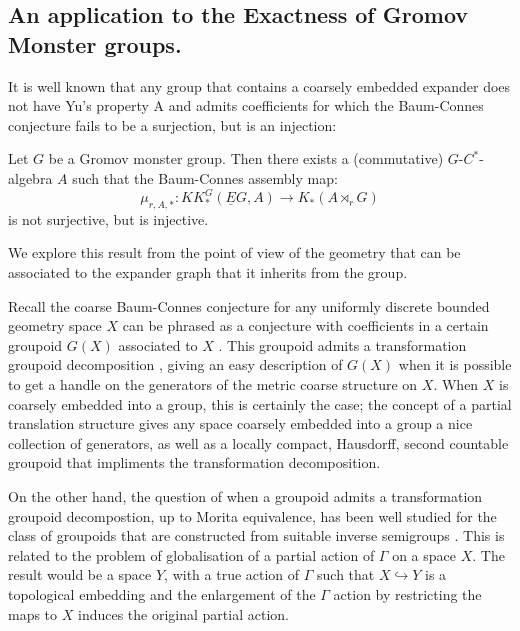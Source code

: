\begin{example}
\section{An application to the Exactness of Gromov Monster groups.}

It is well known \cite{MR1911663,explg1} that any group that contains a coarsely embedded expander does not have Yu's property A and admits coefficients for which the Baum-Connes conjecture fails to be a surjection, but is an injection:

\begin{theorem}\label{Thm:IT1}
Let $G$ be a Gromov monster group. Then there exists a (commutative) $G$-$C^{*}$-algebra $A$ such that the Baum-Connes assembly map:
\begin{equation*}
\mu_{r,A,*}: KK^{G}_{*}(\underline{E}G, A) \rightarrow K_{*}(A\rtimes_{r}G)
\end{equation*}
is not surjective, but is injective.
\end{theorem}

We explore this result from the point of view of the geometry that can be associated to the expander graph that it inherits from the group.

Recall the coarse Baum-Connes conjecture for any uniformly discrete bounded geometry space $X$ can be phrased as a conjecture with coefficients in a certain groupoid $G(X)$ associated to $X$ \cite{MR1905840}. This groupoid admits a transformation groupoid decomposition \cite[Lemma 3.3b)]{MR1905840}, giving an easy description of $G(X)$ when it is possible to get a handle on the generators of the metric coarse structure on $X$. When $X$ is coarsely embedded into a group, this is certainly the case; the concept of a partial translation structure \cite{MR2363428} gives any space coarsely embedded into a group a nice collection of generators, as well as a locally compact, Hausdorff, second countable \etale groupoid that impliments the transformation decomposition.

On the other hand, the question of when a groupoid admits a transformation groupoid decompostion, up to Morita equivalence, has been well studied for the class of groupoids that are constructed from suitable inverse semigroups \cite{MR1900993,Milan-Steinberg}. This is related to the problem of globalisation of a partial action of $\Gamma$ on a space $X$. The result would be a space $Y$, with a true action of $\Gamma$ such that $X \hookrightarrow Y$ is a topological embedding and the enlargement of the $\Gamma$ action by restricting the maps to $X$ induces the original partial action.


\end{example}
